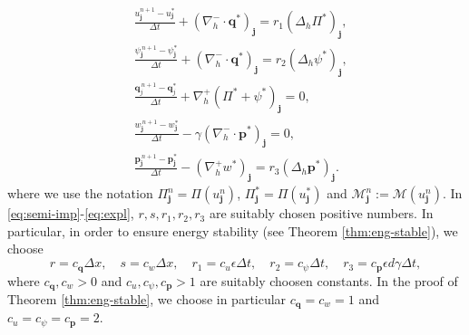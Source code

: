 \documentclass[11pt]{article}
\numberwithin{equation}{section}
\newtheorem{counter example}[theorem]{Counter Example}
\numberwithin{equation}{section}
\numberwithin{equation}{section}
\begin{document}
\begin{subequations}
\label{eq:expl}
\begin{align}
&\frac{u_{\mathbf{j}}^{n+1} - u_{\mathbf{j}}^{*}}{\Delta t} + (\nabla_h^- \cdot\mathbf{q}^*)_{\mathbf{j}} = r_1(\Delta_{h} \Pi^*)_{\mathbf{j}}, \label{eq:h_updt}\\
&\frac{\psi_{\mathbf{j}}^{\,n+1} - \psi^*_{\mathbf{j}}}{\Delta t} + (\nabla_h^- \cdot\mathbf{q}^*)_{\mathbf{j}} = r_2(\Delta_h \psi^*)_{\mathbf{j}}, \label{eq:psi_updt}\\
&\frac{\mathbf{q}_{j}
^{\,n+1}-\mathbf{q}_{j}^{*}}{\Delta t} + \nabla_h^+(\Pi^*+\psi^{*})_{\mathbf{j}} = 0, \label{eq:q_updt}\\
&\frac{w_{\mathbf{j}}^{\,n+1} - w_{\mathbf{j}}^{*}}{\Delta t} -\gamma (\nabla_h^- \cdot \mathbf{p}^*)_{\mathbf{j}} = 0, \label{eq:w_updt}\\
&\frac{\mathbf{p}_{\mathbf{j}}^{\,n+1} - \mathbf{p}_{\mathbf{j}}^{*}}{\Delta t} - (\nabla_h^+ w^{*})_{\mathbf{j}}= r_3(\Delta_h \mathbf{p}^*)_{\mathbf{j}}.\label{eq:p_updt}
\end{align}
\end{subequations}
where we use the notation $\Pi^n_{\mathbf{j}}=\Pi(u_{\mathbf{j}}^n)$,  $\Pi^*_{\mathbf{j}}=\Pi(u_{\mathbf{j}}^*)$ and $\mathcal{M}_{\mathbf{j}}^n:=\mathcal{M}(u_{\mathbf{j}}^n)$. In \eqref{eq:semi-imp}-\eqref{eq:expl}, $r, s, r_1, r_2, r_3$ are suitably chosen positive numbers. In particular, in order to ensure energy stability (see Theorem \ref{thm:eng-stable}), we choose 
\[
r=c_\mathbf{q} \Delta x, \quad s=c_w \Delta x, \quad r_1=c_u \epsilon\Delta t, \quad r_2=c_\psi \Delta t, \quad r_3=c_\mathbf{p}\epsilon d\gamma\Delta t,
\]
where $c_\mathbf{q}, c_w>0$ and $c_u, c_\psi, c_\mathbf{p}>1$ are suitably choosen constants. In the proof of Theorem  \ref{thm:eng-stable}, we choose in particular $c_\mathbf{q}=c_w=1$ and $c_u=c_\psi= c_\mathbf{p}=2$.
\end{document}
